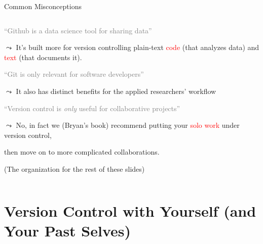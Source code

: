 \documentclass[ignorenonframetext, 10pt, aspectratio=169]{beamer}
\begin{document}
\begin{frame}{Common Misconceptions}
\begin{columns}
\begin{column}{0.8\textwidth}
\begin{wideenumerate}
\item \textcolor{gray}{``Github is a data science tool for sharing data''}
\begin{wideitemize}
\item[{}] $\leadsto$ \pause It's built more for version controlling plain-text \textcolor{red}{code} (that analyzes data) and \textcolor{red}{text} (that documents it).
\end{wideitemize}
\item \textcolor{gray}{``Git is only relevant for software developers''}
\begin{wideitemize}
\item[{}] $\leadsto$ \pause It also has distinct benefits for the applied researchers' workflow
\end{wideitemize}
\item \textcolor{gray}{``Version control is \emph{only} useful for collaborative projects''}
\begin{wideitemize}
\item[{}] $\leadsto$ \pause No, in fact we (Bryan's book) recommend putting your \textcolor{red}{solo work} under version control,
\item[{}] then move on to more complicated collaborations.
\item[{}] {(The organization for the rest of these slides)}
\end{wideitemize}
\end{wideenumerate}
\end{column}
\end{columns}
\end{frame}


\section{Version Control with Yourself (and Your Past Selves)}
\end{document}
